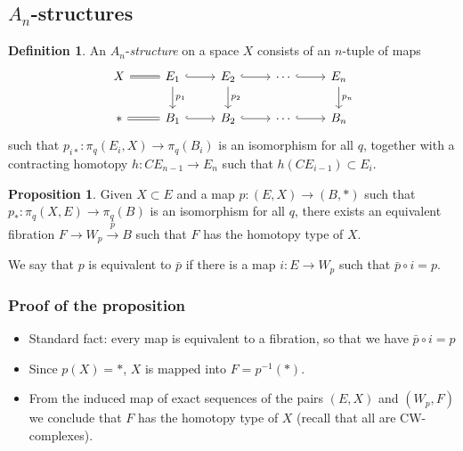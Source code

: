 \documentclass{beamer}
\theoremstyle{definition}
\newtheorem{defi}{Definition}
\newtheorem{prop}[teorema]{Proposition}
\begin{document}
\subsection{$A_n$-structures}
\begin{frame}[fragile]
\begin{defi}
An $A_n$-\emph{structure} on a space $X$ consists of an $n$-tuple of maps
\[
\begin{tikzcd}
X \arrow[r, equals] & E_1\arrow[r, hook]\arrow[d, "p_1"] & E_2\arrow[r, hook]\arrow[d, "p_2"] &\cdots\arrow[r, hook]& E_n\arrow[d, "p_n"] \\
*\arrow[r, equals] & B_1\arrow[r, hook] & 
B_2\arrow[r, hook]&\cdots\arrow[r, hook]& B_n
\end{tikzcd}
\]
such that $p_{i*}:\pi_q(E_i,X)\to \pi_q(B_i)$ is an isomorphism for all $q$, together with a contracting homotopy $h:CE_{n-1}\to E_n$ such that $h(CE_{i-1})\subset E_i$. %

\end{defi}
\end{frame}

\begin{frame}
\begin{prop}
Given $X\subset E$ and a map $p:(E,X)\to (B,*)$ such that $p_*:\pi_q(X,E)\to \pi_q(B)$ is an isomorphism for all $q$, there exists an equivalent fibration $F\to W_p\xrightarrow{\bar{p}} B$ such that $F$ has the homotopy type of $X$. 
\end{prop}\pause
We say that $p$ is equivalent to $\bar{p}$ if there is a map $i:E\to W_p$ such that $\bar{p}\circ i=p$.
 
\end{frame}
\begin{frame}
\frametitle{Proof of the proposition}
\begin{itemize}
\item<1-> Standard fact: every map is equivalent to a fibration, so that we have $\bar{p}\circ i=p$ %
\item<2-> Since $p(X)=*$, $X$ is mapped into $F=p^{-1}(*)$.
\item<3-> From the induced map of exact sequences of the pairs $(E,X)$ and $(W_p,F)$ we conclude that $F$ has the homotopy type of $X$ (recall that all are CW-complexes). 
\end{itemize}

\end{frame}
\end{document}
